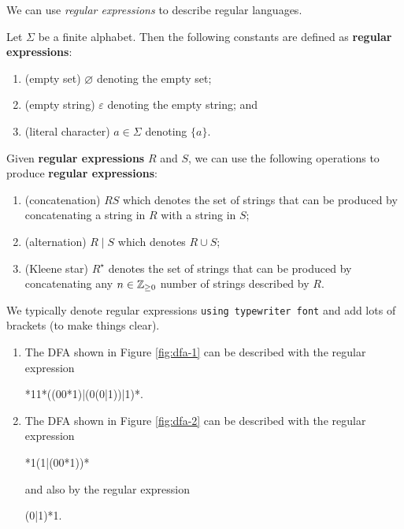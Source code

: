 We can use \emph{regular expressions} to 
describe regular languages.

\begin{definition}
    Let $\Sigma$ be a finite alphabet.
    Then the following constants are defined as \textbf{regular expressions}:
    \begin{enumerate}
        \item (empty set)         $\varnothing$ denoting the empty set;
        \item (empty string)      $\varepsilon$ denoting the empty string; and
        \item (literal character) $a \in \Sigma$ denoting $\{a\}$.
    \end{enumerate}
    Given \textbf{regular expressions} $R$ and $S$,
    we can use the following operations to produce \textbf{regular expressions}:
    \begin{enumerate}
        \item (concatenation) $RS$
            which denotes the set of strings that can be produced
            by concatenating a string in $R$ with a string in $S$;
        \item (alternation) $R \mid S$
            which denotes $R \cup S$;
        
        \item (Kleene star) $R^\star$
            denotes the set of strings that can be produced
            by concatenating any $n \in \mathbb{Z}_{\geq 0}$ number of
            strings described by $R$.
    \end{enumerate}
\end{definition}

\begin{remark}
    We typically denote regular expressions
    \texttt{using typewriter font}
    and add lots of brackets
    (to make things clear).
\end{remark}

\begin{example}
    \hfill
    \begin{enumerate}
        \item 
            The DFA shown in Figure \ref{fig:dfa-1}
            can be described with the regular expression
            \begin{center}
                *11*((00*1)|(0(0|1))|1)*.
            \end{center}

        \item
            The DFA shown in Figure \ref{fig:dfa-2}
            can be described with the regular expression
            \begin{center}
                *1(1|(00*1))*
            \end{center}
            and also by the regular expression
            \begin{center}
                \ttfamily
                (0|1)*1.
            \end{center}
    \end{enumerate}
\end{example}

